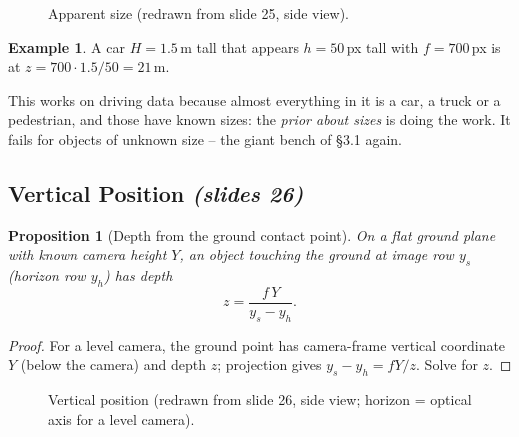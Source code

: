 \documentclass[11pt,a4paper]{article}
\numberwithin{equation}{section}
\newcommand{\slides}[1]{\texorpdfstring{\;\emph{(slides #1)}}{ (slides #1)}}
\theoremstyle{plain}
\newtheorem{proposition}[theorem]{Proposition}
\theoremstyle{definition}
\newtheorem{example}[theorem]{Example}
\begin{document}
\begin{figure}[htbp]
\centering
{}
\caption{Apparent size (redrawn from slide 25, side view).}
\end{figure}
 
\begin{example}
A car $H=1.5$\,m tall that appears $h=50$\,px tall with $f=700$\,px is at $z=700\cdot1.5/50=21$\,m.
\end{example}
 
\begin{intuition}
This works on driving data because almost everything in it is a car, a truck or a pedestrian, and those have known sizes: the \emph{prior about sizes} is doing the work. It fails for objects of unknown size -- the giant bench of \S3.1 again.
\end{intuition}
 
\subsection{Vertical Position \slides{26}}
 
\begin{proposition}[Depth from the ground contact point]\label{prop:vertical}
On a flat ground plane with known camera height $Y$, an object touching the ground at image row $y_s$ (horizon row $y_h$) has depth
\[
z=\frac{f\,Y}{y_s-y_h}.
\]
\end{proposition}
\begin{proof}
For a level camera, the ground point has camera-frame vertical coordinate $Y$ (below the camera) and depth $z$; projection gives $y_s-y_h=fY/z$. Solve for $z$. \qedhere
\end{proof}
 
\begin{figure}[htbp]
\centering
{}
\caption{Vertical position (redrawn from slide 26, side view; horizon = optical axis for a level camera).}
\end{figure}
 
\end{document}
